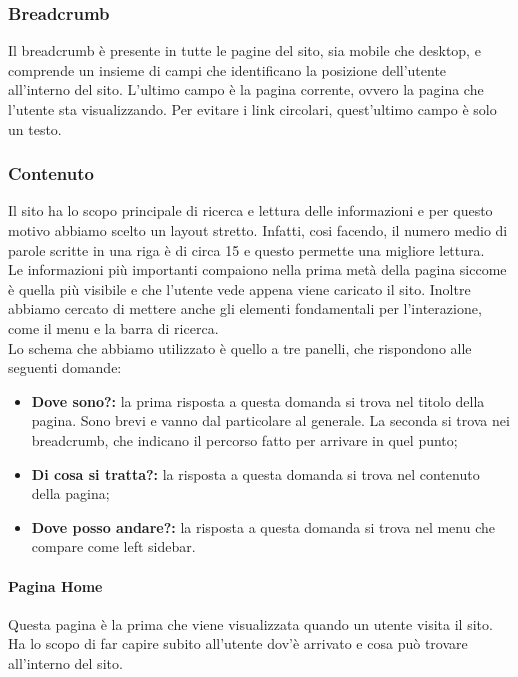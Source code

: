 \subsubsection{Breadcrumb}
Il breadcrumb è presente in tutte le pagine del sito, sia mobile che desktop, e comprende un insieme di campi che identificano la posizione dell'utente all'interno del sito. L'ultimo campo è la pagina corrente, ovvero la pagina che l'utente sta visualizzando. Per evitare i link circolari, quest'ultimo campo è solo un testo.

\subsubsection{Contenuto} \label{subsection:contenuto}
Il sito ha lo scopo principale di ricerca e lettura delle informazioni e per questo motivo abbiamo scelto un layout stretto. Infatti, cosi facendo, il numero medio di parole scritte in una riga è di circa 15 e questo permette una migliore lettura.\\
Le informazioni più importanti compaiono nella prima metà della pagina siccome è quella più visibile e che l'utente vede appena viene caricato il sito. Inoltre abbiamo cercato di mettere anche gli elementi fondamentali per l'interazione, come il menu e la barra di ricerca.\\
Lo schema che abbiamo utilizzato è quello a tre panelli, che rispondono alle seguenti domande:
\begin{itemize}
	\item \textbf{Dove sono?:} la prima risposta a questa domanda si trova nel titolo della pagina. Sono brevi e vanno dal particolare al generale. La seconda si trova nei breadcrumb, che indicano il percorso fatto per arrivare in quel punto;
	\item \textbf{Di cosa si tratta?:} la risposta a questa domanda si trova nel contenuto della pagina;
	\item \textbf{Dove posso andare?:} la risposta a questa domanda si trova nel menu che compare come left sidebar.
\end{itemize}

\paragraph{Pagina Home} Questa pagina è la prima che viene visualizzata quando un utente visita il sito. Ha lo scopo di far capire subito all'utente dov'è arrivato e cosa può trovare all'interno del sito.

